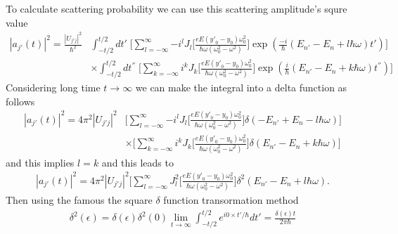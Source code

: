 To calculate scattering probability we can use this scattering amplitude's squre value
\begin{equation} \label{2.22}
  \begin{aligned}
    |a_{j'}(t)|^2  =
   \frac{|U_{j'j}|^2}{\hbar^2} &
   \int_{-t/2}^{t/2} dt' \;
   \bigg[
   \sum_{l=-\infty}^{\infty} {-i}^l J_l\bigg[\frac{eE({y'}_0 - y_0)\omega_0^2}{\hbar\omega(\omega_0^2-\omega^2)}\bigg]
     \exp(
    \frac{-i}{\hbar} (E_{n'} -E_{n} + l\hbar\omega) t')
    \bigg] \\
    & \times
    \int_{-t/2}^{t/2} dt^{''} \;
    \bigg[
    \sum_{k=-\infty}^{\infty} i^k J_k\bigg[\frac{eE({y'}_0 - y_0)\omega_0^2}{\hbar\omega(\omega_0^2-\omega^2)}\bigg]
      \exp(
     \frac{i}{\hbar} (E_{n'} -E_{n} + k\hbar\omega) t^{''})
     \bigg]
  \end{aligned}
\end{equation}
Considering long time $t\rightarrow \infty$ we can make the integral into a delta function as follows
\begin{equation} \label{2.22}
  \begin{aligned}
    |a_{j'}(t)|^2  =
   4\pi^2|U_{j'j}|^2 &
   \bigg[
   \sum_{l=-\infty}^{\infty} {-i}^l J_l\bigg[\frac{eE({y'}_0 - y_0)\omega_0^2}{\hbar\omega(\omega_0^2-\omega^2)}\bigg]
     \delta(-E_{n'} +E_{n} - l\hbar\omega)
     \bigg] \\
    & \times
    \bigg[
    \sum_{k=-\infty}^{\infty} i^k J_k\bigg[\frac{eE({y'}_0 - y_0)\omega_0^2}{\hbar\omega(\omega_0^2-\omega^2)}\bigg]
      \delta(E_{n'} - E_{n} + k\hbar\omega)
     \bigg]
  \end{aligned}
\end{equation}
and this implies $l=k$ and this leads to
\begin{equation} \label{2.22}
  \begin{aligned}
    |a_{j'}(t)|^2  =
   4\pi^2|U_{j'j}|^2
   \bigg[
   \sum_{l=-\infty}^{\infty} J_l^2\bigg[\frac{eE({y'}_0 - y_0)\omega_0^2}{\hbar\omega(\omega_0^2-\omega^2)}\bigg]
     \delta^2(E_{n'} - E_{n} + l\hbar\omega).
  \end{aligned}
\end{equation}
Then using the famous the square $\delta$ function transormation method
\begin{equation} \label{2.22}
  \begin{aligned}
     \delta^2(\epsilon ) = \delta(\epsilon )\delta^2(0)
     \lim_{t\rightarrow\infty} \int_{-t/2}^{t/2} e^{i0\times t' /\hbar} dt' =
     \frac{\delta(\epsilon) t}{2\pi \hbar}
  \end{aligned}
\end{equation}
